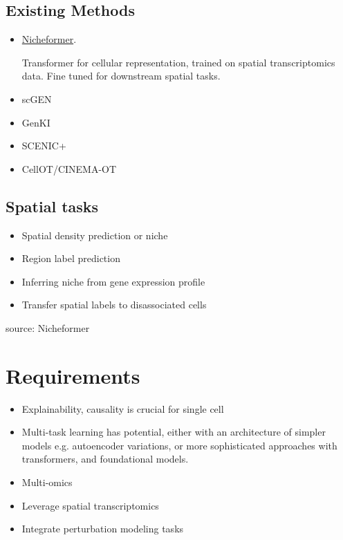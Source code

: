 \documentclass[12pt, a4paper]{article}
\begin{document}
\subsection{Existing Methods}

\begin{itemize}
  \item \href{https://www.biorxiv.org/content/10.1101/2024.04.15.589472v1}{Nicheformer}.
  
  Transformer for cellular representation, trained on spatial transcriptomics data. Fine tuned for downstream spatial tasks.

  \item scGEN
  \item GenKI
  \item SCENIC+
  \item CellOT/CINEMA-OT
\end{itemize}

\subsection{Spatial tasks}

\begin{itemize}
  \item Spatial density prediction or niche 
  \item Region label prediction 
  \item Inferring niche from gene expression profile
  \item Transfer spatial labels to disassociated cells
\end{itemize}
source: Nicheformer

\section{Requirements}

\begin{itemize}
  \item Explainability, causality is crucial for single cell
  \item Multi-task learning has potential, either with an architecture of simpler models e.g. autoencoder variations, or more sophisticated approaches with transformers, and foundational models.
  \item Multi-omics
  \item Leverage spatial transcriptomics
  \item Integrate perturbation modeling tasks
\end{itemize}
\end{document}
